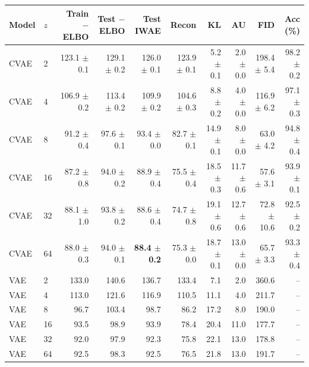 \begin{tabular}{llrrrrrrrr}
\toprule
Model & $z$ & Train $-$ELBO & Test $-$ELBO & Test IWAE & Recon & KL & AU & FID & Acc (\%) \\
\midrule
CVAE & 2 & 123.1 $\pm$ 0.1 & 129.1 $\pm$ 0.2 & 126.0 $\pm$ 0.1 & 123.9 $\pm$ 0.1 & 5.2 $\pm$ 0.1 & 2.0 $\pm$ 0.0 & 198.4 $\pm$ 5.4 & 98.2 $\pm$ 0.2 \\
CVAE & 4 & 106.9 $\pm$ 0.2 & 113.4 $\pm$ 0.2 & 109.9 $\pm$ 0.2 & 104.6 $\pm$ 0.3 & 8.8 $\pm$ 0.2 & 4.0 $\pm$ 0.0 & 116.9 $\pm$ 6.2 & 97.1 $\pm$ 0.3 \\
CVAE & 8 & 91.2 $\pm$ 0.4 & 97.6 $\pm$ 0.1 & 93.4 $\pm$ 0.0 & 82.7 $\pm$ 0.1 & 14.9 $\pm$ 0.1 & 8.0 $\pm$ 0.0 & 63.0 $\pm$ 4.2 & 94.8 $\pm$ 0.4 \\
CVAE & 16 & 87.2 $\pm$ 0.8 & 94.0 $\pm$ 0.2 & 88.9 $\pm$ 0.4 & 75.5 $\pm$ 0.4 & 18.5 $\pm$ 0.3 & 11.7 $\pm$ 0.6 & 57.6 $\pm$ 3.1 & 93.9 $\pm$ 0.1 \\
CVAE & 32 & 88.1 $\pm$ 1.0 & 93.8 $\pm$ 0.2 & 88.6 $\pm$ 0.4 & 74.7 $\pm$ 0.8 & 19.1 $\pm$ 0.6 & 12.7 $\pm$ 0.6 & 72.8 $\pm$ 10.6 & 92.5 $\pm$ 0.2 \\
CVAE & 64 & 88.0 $\pm$ 0.3 & 94.0 $\pm$ 0.1 & \textbf{88.4 $\pm$ 0.2} & 75.3 $\pm$ 0.0 & 18.7 $\pm$ 0.1 & 13.0 $\pm$ 0.0 & 65.7 $\pm$ 3.3 & 93.3 $\pm$ 0.4 \\
\midrule
VAE & 2 & 133.0 & 140.6 & 136.7 & 133.4 & 7.1 & 2.0 & 360.6 & -- \\
VAE & 4 & 113.0 & 121.6 & 116.9 & 110.5 & 11.1 & 4.0 & 211.7 & -- \\
VAE & 8 & 96.7 & 103.4 & 98.7 & 86.2 & 17.2 & 8.0 & 190.0 & -- \\
VAE & 16 & 93.5 & 98.9 & 93.9 & 78.4 & 20.4 & 11.0 & 177.7 & -- \\
VAE & 32 & 92.0 & 97.9 & 92.3 & 75.8 & 22.1 & 13.0 & 178.8 & -- \\
VAE & 64 & 92.5 & 98.3 & 92.5 & 76.5 & 21.8 & 13.0 & 191.7 & -- \\
\bottomrule
\end{tabular}
